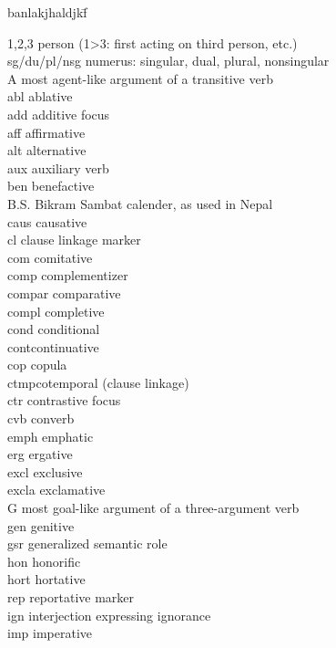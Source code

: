  {\small
\begin{tabbing}
banlakjhaldjkf\= \kill

1,2,3 		\> person (1>3: first acting on third person, etc.)\\
{\sc sg/du/pl/nsg} 		\> numerus: singular, dual, plural, nonsingular\\
A		\> most agent-like argument of a transitive verb\\
{\sc abl} \> ablative\\
{\sc add}\> additive focus\\
{\sc aff} \> affirmative\\
{\sc alt} \> alternative\\
{\sc aux}\> auxiliary verb\\
{\sc ben}		\> benefactive \\
{\sc B.S.}		\> Bikram Sambat calender, as used in Nepal\\
{\sc caus} \> causative\\
{\sc cl}\> clause linkage marker\\
{\sc com} \> comitative\\
{\sc comp} \> complementizer\\
{\sc compar} \> comparative\\
{\sc compl}\> completive\\
{\sc cond} \> conditional\\
{\sc cont}\>continuative\\
{\sc cop} \> copula\\
{\sc ctmp}\>cotemporal (clause linkage)\\
{\sc ctr} \> contrastive focus\\
{\sc cvb} \> converb\\
{\sc emph} \> emphatic\\
{\sc erg} \> ergative \\
{\sc excl} \> exclusive\\
{\sc excla}\> exclamative\\
G \> most goal-like argument of a three-argument verb\\
{\sc gen} \> genitive\\
{\sc gsr} \> generalized semantic role\\
{\sc hon}\> honorific\\
{\sc hort} \> hortative\\
{\sc rep}\> reportative marker\\
{\sc ign}\>  interjection expressing ignorance\\
{\sc imp} \> imperative\\

\end{tabbing}}
